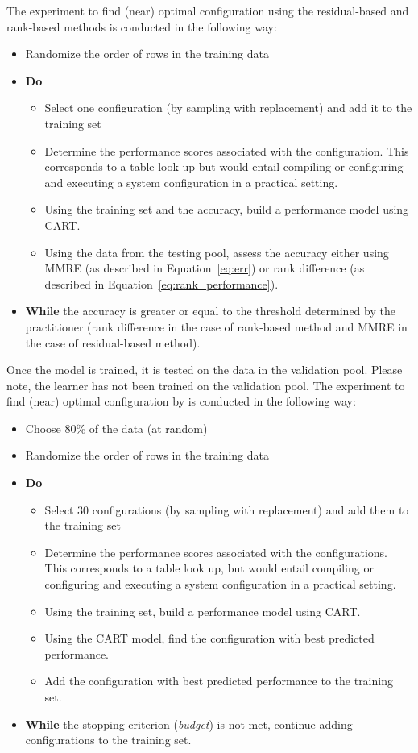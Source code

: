 The experiment to find (near) optimal configuration using the residual-based and rank-based methods is conducted in the following way:
\begin{itemize}[leftmargin=*]
    \item Randomize the order of rows  in  the training data
    \item \textbf{Do}
    \begin{itemize}
        \item Select one configuration (by sampling with replacement) and add it to the training set
        \item Determine the performance scores associated with the configuration. This corresponds to a table look up but would entail compiling or configuring and executing a system configuration in a practical setting.
        \item Using the training set and the accuracy, build a performance model using CART.
        \item Using the data from the testing pool, assess the accuracy either using MMRE (as described in Equation~\ref{eq:err}) or rank difference (as described in Equation~\ref{eq:rank_performance}).         
    \end{itemize}
    \item \textbf{While} the accuracy is greater or equal to the threshold determined by the practitioner (rank difference in the case of rank-based method and MMRE in the case of residual-based method).
\end{itemize}
Once the model is trained, it is tested on the data in the validation pool. Please note, the learner has not been trained on the validation pool.
The experiment to find (near) optimal configuration by \flash is conducted in the following way:
\begin{itemize}[leftmargin=*]
    \item Choose 80\% of the data (at random)
    \item Randomize the order of rows  in  the training data
    \item \textbf{Do}
    \begin{itemize}
    \item Select 30 configurations (by sampling with replacement) and add them to the training set
        \item Determine the performance scores associated with the configurations. This corresponds to  a table look up, but would entail compiling or configuring and executing a system configuration in a practical setting.
        \item Using the training set, build a performance model using CART.
        \item Using the CART model, find the configuration with best predicted performance.
        \item Add the configuration with best predicted performance to the training set.
    \end{itemize}
    \item \textbf{While} the stopping criterion (\textit{budget}) is not met, continue adding configurations to the training set.
\end{itemize}

